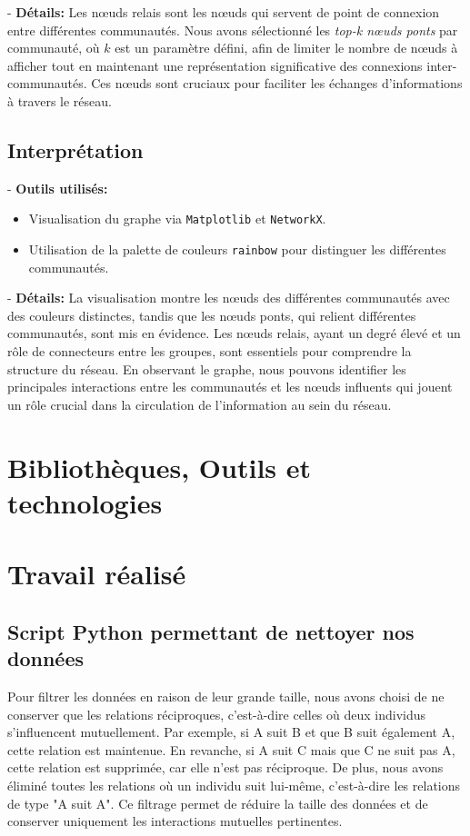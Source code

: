 \documentclass[a4paper, 12pt, twoside]{article}
\begin{document}
    - \textbf{Détails:}
    Les nœuds relais sont les nœuds qui servent de point de connexion entre différentes communautés. Nous avons sélectionné les \textit{top-k nœuds ponts} par communauté, où \(k\) est un paramètre défini, afin de limiter le nombre de nœuds à afficher tout en maintenant une représentation significative des connexions inter-communautés. Ces nœuds sont cruciaux pour faciliter les échanges d'informations à travers le réseau.

\subsection{Interprétation}
    - \textbf{Outils utilisés:}
    \begin{itemize}
        \item Visualisation du graphe via \texttt{Matplotlib} et \texttt{NetworkX}.
        \item Utilisation de la palette de couleurs \texttt{rainbow} pour distinguer les différentes communautés.
    \end{itemize}
    
    - \textbf{Détails:}
    La visualisation montre les nœuds des différentes communautés avec des couleurs distinctes, tandis que les nœuds ponts, qui relient différentes communautés, sont mis en évidence. Les nœuds relais, ayant un degré élevé et un rôle de connecteurs entre les groupes, sont essentiels pour comprendre la structure du réseau. En observant le graphe, nous pouvons identifier les principales interactions entre les communautés et les nœuds influents qui jouent un rôle crucial dans la circulation de l'information au sein du réseau.


\section{Bibliothèques, Outils et technologies}
\section{Travail réalisé}

\subsection{Script Python permettant de nettoyer nos données}

Pour filtrer les données en raison de leur grande taille, nous avons choisi de ne conserver que les relations réciproques, c’est-à-dire celles où deux individus s'influencent mutuellement. Par exemple, si A suit B et que B suit également A, cette relation est maintenue. En revanche, si A suit C mais que C ne suit pas A, cette relation est supprimée, car elle n’est pas réciproque. De plus, nous avons éliminé toutes les relations où un individu suit lui-même, c'est-à-dire les relations de type "A suit A". Ce filtrage permet de réduire la taille des données et de conserver uniquement les interactions mutuelles pertinentes.
\end{document}
